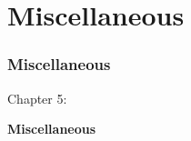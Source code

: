 %

\section{Miscellaneous}
\begin{frame}[fragile]
	\frametitle{Miscellaneous}

	\begin{center}\huge{Chapter 5:}\end{center}
	\begin{center}\huge{\color{typo3darkgrey}\textbf{Miscellaneous}}\end{center}

\end{frame}


